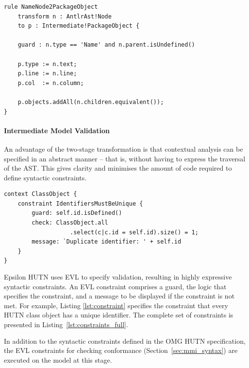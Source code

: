 \begin{lstlisting}[caption=Transforming Nodes to PackageObjects with ETL., label=lst:m2m, language=ETL]
rule NameNode2PackageObject
    transform n : AntlrAst!Node
    to p : Intermediate!PackageObject {

    guard : n.type == 'Name' and n.parent.isUndefined()

    p.type := n.text;
    p.line := n.line;
    p.col  := n.column;

    p.objects.addAll(n.children.equivalent());
}
\end{lstlisting}

\paragraph{Intermediate Model Validation}
An advantage of the two-stage transformation is that contextual analysis can be specified in an abstract manner -- that is, without having to express the traversal of the AST. This gives clarity and minimises the amount of code required to define syntactic constraints.

\begin{lstlisting}[caption={[Consistency constraint for checking the uniqueness of identifiers]A constraint (in EVL) to check that all identifiers are unique}, label=lst:constraint, language=EVL]
context ClassObject {
    constraint IdentifiersMustBeUnique {
        guard: self.id.isDefined()
        check: ClassObject.all
                   .select(c|c.id = self.id).size() = 1;
        message: `Duplicate identifier: ' + self.id
    }
}
\end{lstlisting}

Epsilon HUTN uses EVL \cite{kolovos08evl} to specify validation, resulting in highly expressive syntactic constraints. An EVL constraint comprises a guard, the logic that specifies the constraint, and a message to be displayed if the constraint is not met. For example, Listing \ref{lst:constraint} specifies the constraint that every HUTN class object has a unique identifier. The complete set of constraints is presented in Listing~\ref{lst:constraints_full}.

In addition to the syntactic constraints defined in the OMG HUTN specification, the EVL constraints for checking conformance (Section~\ref{sec:mmi_syntax}) are executed on the model at this stage.

